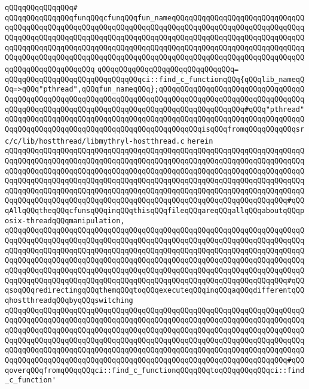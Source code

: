 \verb|qQQqqQQqqQQqqQQq#|\newline
\verb|qQQqqQQqqQQqqQQqfunqQQqcfunqQQqfun_nameqQQqqQQqqQQqqQQqqQQqqQQqqQQqqQQqqQQqqQQqqQQqqQQqqQQqqQQqqQQqqQQqqQQqqQQqqQQqqQQqqQQqqQQqqQQqqQQqqQQqqQQqqQQqqQQqqQQqqQQqqQQqqQQqqQQqqQQqqQQqqQQqqQQqqQQqqQQqqQQqqQQqqQQqqQQqqQQqqQQqqQQqqQQqqQQqqQQqqQQqqQQqqQQqqQQqqQQqqQQqqQQqqQQqqQQqqQQqqQQqqQQqqQQqqQQqqQQqqQQqqQQqqQQqqQQqqQQqqQQqqQQqqQQqqQQqqQQqqQQqqQQqqQQqqQQqqQQqqQQqqQQqqQQqqQQq|\newline
\verb|qQQqqQQqqQQqqQQqqQQqqQQqqQQqqQQq=|\newline
\verb|qQQqqQQqqQQqqQQqqQQqqQQqqQQqqQQqci::find_c_functionqQQq{qQQqlib_nameqQQq=>qQQq"pthread",qQQqfun_nameqQQq};qQQqqQQqqQQqqQQqqQQqqQQqqQQqqQQqqQQqqQQqqQQqqQQqqQQqqQQqqQQqqQQqqQQqqQQqqQQqqQQqqQQqqQQqqQQqqQQqqQQqqQQqqQQqqQQqqQQqqQQqqQQqqQQqqQQqqQQqqQQqqQQqqQQqqQQqqQQqqQQq#qQQq"pthread"qQQqqQQqqQQqqQQqqQQqqQQqqQQqqQQqqQQqqQQqqQQqqQQqqQQqqQQqqQQqqQQqqQQqqQQqqQQqqQQqqQQqqQQqqQQqqQQqqQQqqQQqqQQqqQQqqQQqisqQQqfromqQQqqQQqqQQqsrc/c/lib/hostthread/libmythryl-hostthread.c|\newline
\verb|herein|\newline
\verb|qQQqqQQqqQQqqQQqqQQqqQQqqQQqqQQqqQQqqQQqqQQqqQQqqQQqqQQqqQQqqQQqqQQqqQQqqQQqqQQqqQQqqQQqqQQqqQQqqQQqqQQqqQQqqQQqqQQqqQQqqQQqqQQqqQQqqQQqqQQqqQQqqQQqqQQqqQQqqQQqqQQqqQQqqQQqqQQqqQQqqQQqqQQqqQQqqQQqqQQqqQQqqQQqqQQqqQQqqQQqqQQqqQQqqQQqqQQqqQQqqQQqqQQqqQQqqQQqqQQqqQQqqQQqqQQqqQQqqQQqqQQqqQQqqQQqqQQqqQQqqQQqqQQqqQQqqQQqqQQqqQQqqQQqqQQqqQQqqQQqqQQqqQQqqQQqqQQqqQQqqQQqqQQqqQQqqQQqqQQqqQQqqQQqqQQqqQQqqQQqqQQqqQQqqQQqqQQq#qQQqAllqQQqtheqQQqcfunsqQQqinqQQqthisqQQqfileqQQqareqQQqallqQQqaboutqQQqposix-threadqQQqmanipulation,|\newline
\verb|qQQqqQQqqQQqqQQqqQQqqQQqqQQqqQQqqQQqqQQqqQQqqQQqqQQqqQQqqQQqqQQqqQQqqQQqqQQqqQQqqQQqqQQqqQQqqQQqqQQqqQQqqQQqqQQqqQQqqQQqqQQqqQQqqQQqqQQqqQQqqQQqqQQqqQQqqQQqqQQqqQQqqQQqqQQqqQQqqQQqqQQqqQQqqQQqqQQqqQQqqQQqqQQqqQQqqQQqqQQqqQQqqQQqqQQqqQQqqQQqqQQqqQQqqQQqqQQqqQQqqQQqqQQqqQQqqQQqqQQqqQQqqQQqqQQqqQQqqQQqqQQqqQQqqQQqqQQqqQQqqQQqqQQqqQQqqQQqqQQqqQQqqQQqqQQqqQQqqQQqqQQqqQQqqQQqqQQqqQQqqQQqqQQqqQQqqQQqqQQqqQQqqQQqqQQqqQQq#qQQqsoqQQqredirectingqQQqthemqQQqtoqQQqexecuteqQQqinqQQqaqQQqdifferentqQQqhostthreadqQQqbyqQQqswitching|\newline
\verb|qQQqqQQqqQQqqQQqqQQqqQQqqQQqqQQqqQQqqQQqqQQqqQQqqQQqqQQqqQQqqQQqqQQqqQQqqQQqqQQqqQQqqQQqqQQqqQQqqQQqqQQqqQQqqQQqqQQqqQQqqQQqqQQqqQQqqQQqqQQqqQQqqQQqqQQqqQQqqQQqqQQqqQQqqQQqqQQqqQQqqQQqqQQqqQQqqQQqqQQqqQQqqQQqqQQqqQQqqQQqqQQqqQQqqQQqqQQqqQQqqQQqqQQqqQQqqQQqqQQqqQQqqQQqqQQqqQQqqQQqqQQqqQQqqQQqqQQqqQQqqQQqqQQqqQQqqQQqqQQqqQQqqQQqqQQqqQQqqQQqqQQqqQQqqQQqqQQqqQQqqQQqqQQqqQQqqQQqqQQqqQQqqQQqqQQqqQQqqQQqqQQqqQQqqQQqqQQq#qQQqoverqQQqfromqQQqqQQqci::find_c_functionqQQqqQQqtoqQQqqQQqqQQqci::find_c_function'|\newline
